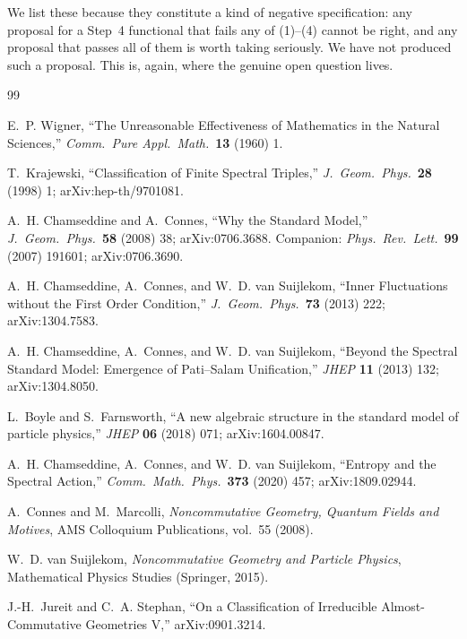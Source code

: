 \documentclass[11pt,a4paper]{article}
\begin{document}
We list these because they constitute a kind of negative specification: any
proposal for a Step~4 functional that fails any of (1)--(4) cannot be right,
and any proposal that passes all of them is worth taking seriously. We have
not produced such a proposal. This is, again, where the genuine open
question lives.

\bigskip\bigskip

\begin{thebibliography}{99}

E.~P. Wigner, ``The Unreasonable Effectiveness of Mathematics in the Natural
Sciences,'' \emph{Comm.\ Pure Appl.\ Math.}\ \textbf{13} (1960) 1.

T.~Krajewski, ``Classification of Finite Spectral Triples,''
\emph{J.\ Geom.\ Phys.}\ \textbf{28} (1998) 1; arXiv:hep-th/9701081.

A.~H. Chamseddine and A.~Connes, ``Why the Standard Model,''
\emph{J.\ Geom.\ Phys.}\ \textbf{58} (2008) 38; arXiv:0706.3688.
Companion: \emph{Phys.\ Rev.\ Lett.}\ \textbf{99} (2007) 191601;
arXiv:0706.3690.

A.~H. Chamseddine, A.~Connes, and W.~D. van Suijlekom, ``Inner Fluctuations
without the First Order Condition,'' \emph{J.\ Geom.\ Phys.}\ \textbf{73}
(2013) 222; arXiv:1304.7583.

A.~H. Chamseddine, A.~Connes, and W.~D. van Suijlekom, ``Beyond the Spectral
Standard Model: Emergence of Pati--Salam Unification,'' \emph{JHEP} \textbf{11}
(2013) 132; arXiv:1304.8050.

L.~Boyle and S.~Farnsworth, ``A new algebraic structure in the standard model
of particle physics,'' \emph{JHEP} \textbf{06} (2018) 071; arXiv:1604.00847.

A.~H. Chamseddine, A.~Connes, and W.~D. van Suijlekom, ``Entropy and the
Spectral Action,'' \emph{Comm.\ Math.\ Phys.}\ \textbf{373} (2020) 457;
arXiv:1809.02944.

A.~Connes and M.~Marcolli, \emph{Noncommutative Geometry, Quantum Fields and
Motives}, AMS Colloquium Publications, vol.~55 (2008).

W.~D. van Suijlekom, \emph{Noncommutative Geometry and Particle Physics},
Mathematical Physics Studies (Springer, 2015).

J.-H.~Jureit and C.~A. Stephan, ``On a Classification of Irreducible
Almost-Commutative Geometries V,'' arXiv:0901.3214.


\end{thebibliography}
\end{document}
